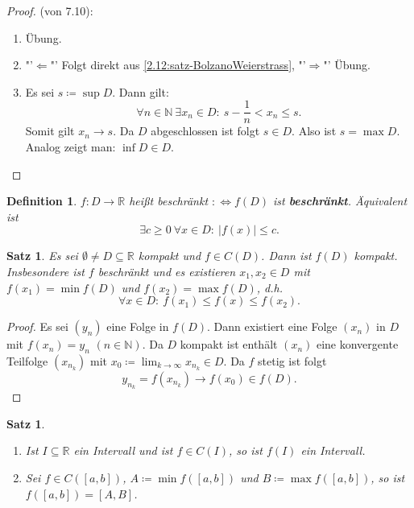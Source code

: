 \documentclass[12pt]{extreport} %
\newcommand{\N}{\mathbb{N}}
\newcommand{\R}{\mathbb{R}}
\theoremstyle{named}
\theoremstyle{itshape}
\newtheorem{satz}[unnamedtheorem]{Satz}
\newtheorem*{definition}{Definition}
\theoremstyle{normal}
\begin{document}
\begin{proof}(von 7.10):
	\begin{enumerate}
		\item Übung.
		\item "'$\Leftarrow$"' Folgt direkt aus \ref{2.12:satz-BolzanoWeierstrass}, "'$\Rightarrow$"' Übung.
		\item Es sei $s \coloneqq \sup D$. Dann gilt: 
			$$ \forall n \in \N ~\exists x_{n} \in D: ~ s - \frac{1}{n} < x_{n} \leq s. $$
			 Somit gilt $x_{n} \rightarrow s$. Da $D$ abgeschlossen ist folgt $s \in D$. Also ist $s = \max D$. \\
			 Analog zeigt man: $\inf D \in D$.
	\end{enumerate}	
\end{proof}

\begin{definition}
	$f \colon D \rightarrow \R$ hei{\ss}t beschränkt $:\iff f(D)$ ist \textbf{beschränkt}. Äquivalent ist 
	$$ \exists c \geq 0 ~\forall x \in D: ~ |f(x)| \leq c. $$
\end{definition}


\begin{satz} \label{7.11:satz}
	Es sei $\emptyset \not= D \subseteq \R$ kompakt und $f \in C(D)$. Dann ist $f(D)$ kompakt. Insbesondere ist $f$ beschränkt und es existieren $x_{1}, x_{2} \in D$ mit 
	$f(x_1)=\min f(D)$ und $f(x_2)=\max f(D)$, d.h.
		$$\forall x \in D: ~  f(x_{1}) \leq f(x) \leq f(x_{2}). $$
\end{satz}

\begin{proof}
	Es sei $(y_{n})$ eine Folge in $f(D)$. Dann existiert eine Folge $(x_{n})$ in $D$ mit $f(x_{n}) = y_{n}$ $(n \in \N)$. Da $D$ kompakt ist enthält $(x_n)$ eine konvergente 
	Teilfolge $(x_{n_{k}})$ mit $x_{0} \coloneqq \lim_{k \rightarrow \infty} x_{n_{k}} \in D$. Da $f$ stetig ist folgt
	$$ y_{n_{k}} = f(x_{n_{k}}) \rightarrow f(x_{0}) \in f(D). $$
\end{proof}


\begin{satz} ~\ \label{7.12:satz}
	\begin{enumerate}
		\item Ist $I \subseteq \R$ ein Intervall und ist $f \in C(I)$, so ist $f(I)$ ein Intervall.
		\item Sei $f \in C([a, b])$, $A \coloneqq \min f([a, b])$ und $B \coloneqq \max f([a, b])$, so ist $f([a, b]) = [A, B]$.
	\end{enumerate}
\end{satz}
\end{document}
